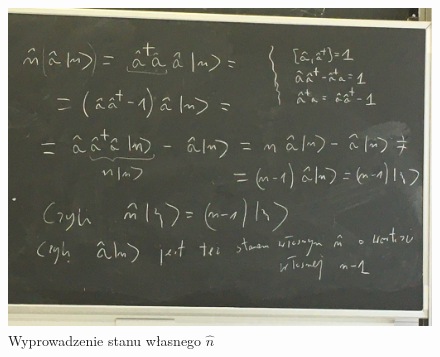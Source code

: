 \documentclass[12pt,a4paper]{report}
\begin{document}
\begin{figure}[!ht]
        \centering
        \includegraphics[width=\linewidth]{App_9_Rys_2.JPG}
        \caption{Wyprowadzenie stanu własnego $\hat{n}$}
        \label{fig:app_9:stany_wlasne_n}
\end{figure}
\end{document}
